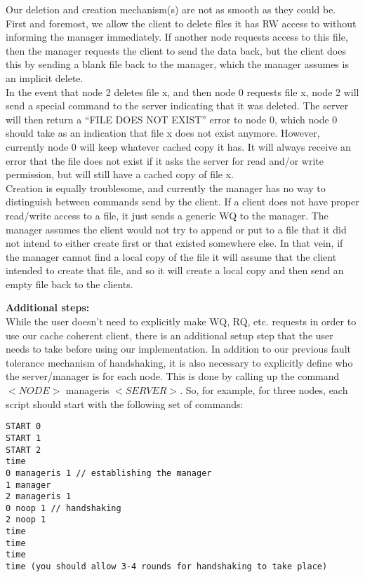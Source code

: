 \documentclass[11pt]{article}
\begin{document}
Our deletion and creation mechanism(s) are not as smooth as they could be. \\

First and foremost, we allow the client to delete files it has RW access to without informing the manager immediately. If another node requests
access to this file, then the manager requests the client to send the data back, but the client does this by sending a blank file back to the 
manager, which the manager assumes is an implicit delete.\\

In the event that node 2 deletes file x, and then node 0 requests file x, node 2 will send a 
special command to the server indicating that it was deleted. The server will then return a “FILE DOES NOT EXIST” error to node 0, which node 0 should 
take as an indication that file x does not exist anymore. However, currently node 0 will keep whatever cached copy it has. It will always receive 
an error that the file does not exist if it asks the server for read and/or write permission, but will still have a cached copy of file x.\\

Creation is equally troublesome, and currently the manager has no way to distinguish between commands send by the client. If a client does not have 
proper read/write access to a file, it just sends a generic WQ to the manager. The manager assumes the client would not try to append or put to a file that it did not intend to either create first
or that existed somewhere else. In that vein, if the manager cannot find a local copy of the file
it will assume that the client intended to create that file, and so it will create a local
copy and then send an empty file back to the clients.

\textbf{Additional steps:} \\

While the user doesn’t need to explicitly make WQ, RQ, etc. requests in order to use our cache coherent client, there is an additional setup step 
that the user needs to take before using our implementation. In addition to our previous fault tolerance mechanism of handshaking, it is also necessary 
to explicitly define who the server/manager is for each node. This is done by calling up the command $<NODE>$ manageris $<SERVER>$. So, for example, for three 
nodes, each script should start with the following set of commands:\\

\begin{verbatim}
START 0
START 1
START 2
time
0 manageris 1 // establishing the manager
1 manager
2 manageris 1
0 noop 1 // handshaking
2 noop 1
time
time
time
time (you should allow 3-4 rounds for handshaking to take place)
\end{verbatim}
\end{document}
